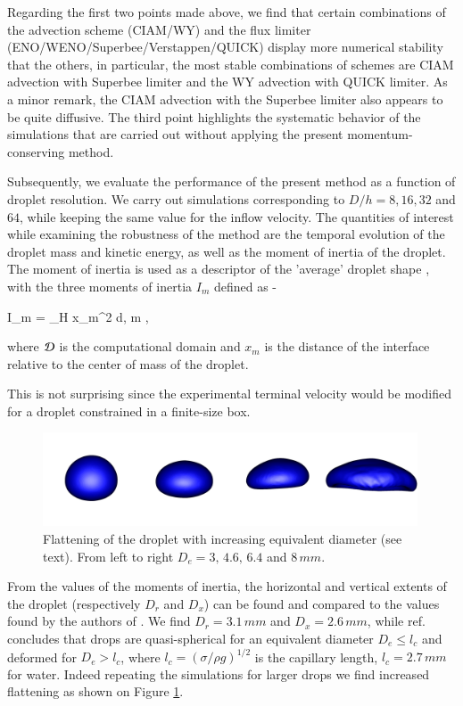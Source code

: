 Regarding the first two points made above, we find that certain combinations of the advection scheme (CIAM/WY) and the flux limiter (ENO/WENO/Superbee/Verstappen/QUICK) display more numerical stability that the others, in particular, the most stable combinations of schemes are CIAM advection with Superbee limiter and the WY advection with QUICK limiter. As a minor remark, the CIAM advection with the Superbee limiter also appears to be quite diffusive. The third point highlights the systematic behavior of the simulations that are carried out without applying the present momentum-conserving method. 

\vspace*{0.2cm}

Subsequently, we evaluate the performance of the present method as a function of droplet resolution. We carry out simulations corresponding to $D/h = 8, 16, 32 $ and $64$, while keeping the same value for the inflow velocity. The quantities of interest while examining the robustness of the method are the temporal evolution of the droplet mass and kinetic energy, as well as the moment of inertia of the droplet. The moment of inertia is used as a descriptor of the 'average' droplet shape , with the three moments of inertia $I_m$ defined as - 

\be
I_m = \int_\DDD H x_m^2 {\rm d}\X \;,  \le m ,
\nd

where ${\cal D}$ is the computational domain and $x_m$ is the distance of the interface relative to the center of mass of the droplet.   


This is not surprising since the experimental terminal velocity would be 
modified for a droplet constrained in a finite-size box.
\begin{figure}
\begin{center}
\includegraphics[width=0.99\textwidth]{Figures/flatten.png}
\end{center}
\caption{Flattening of the droplet with increasing equivalent diameter 
(see text). From left to right $D_e=3, \,4.6,\, 6.4$ and $8\, mm$.}
\label{flatten}
\end{figure}
From the values of the moments of inertia, the horizontal and vertical 
extents of the droplet (respectively $D_r$ and $D_x$) can be found 
and compared to the values found by the authors of \cite{Reyssat:2007ko}. 
We find $D_r=3.1 \,mm$ and $D_x=2.6 \,mm$, while ref. \cite{Reyssat:2007ko} 
concludes that drops are quasi-spherical for an equivalent diameter 
$D_e \le l_c$ and deformed for $D_e > l_c$, where $l_c =(\sigma/\rho g)^{1/2}$ 
is the capillary length, $l_c = 2.7 \,mm$ for water. 
Indeed repeating the simulations for larger drops we find increased 
flattening as shown on Figure \ref{flatten}. 
%

